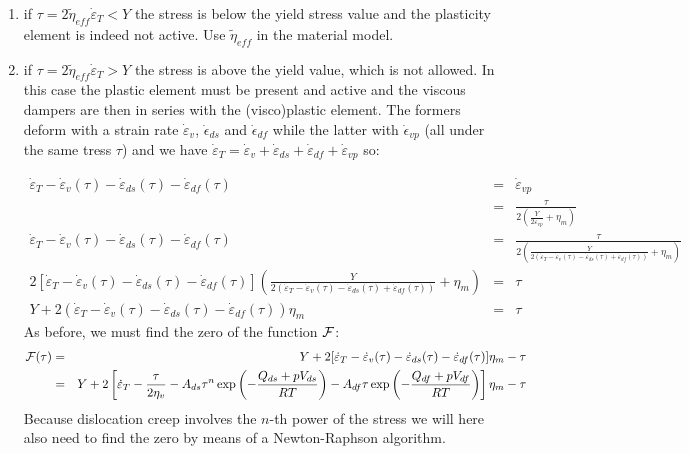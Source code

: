 \begin{itemize}
\begin{enumerate}
\item if $\tau =2 \tilde{\eta}_{eff} \dot\varepsilon_T < Y$ the stress is below the yield stress value 
and the plasticity element is indeed not active. Use $\tilde{\eta}_{eff}$ in the material model.

\item if $\tau=2 \tilde{\eta}_{eff} \dot\varepsilon_T > Y$ the stress is above the yield value, which is not 
allowed. In this case the plastic element must be present and active and the viscous dampers are then 
in series with the (visco)plastic element. The formers deform 
with a strain rate $\dot{\varepsilon}_v$, $\dot\epsilon_{ds}$ and $\dot{\epsilon}_{df}$ 
while the latter with $\dot\epsilon_{vp}$ (all under the same tress $\tau$) 
and we have  $\dot\varepsilon_T = \dot{\varepsilon}_v + \dot\varepsilon_{ds} + \dot\varepsilon_{df} + \dot\varepsilon_{vp}$ so:

\begin{eqnarray}
\dot\varepsilon_T - \dot{\varepsilon}_v(\tau) - \dot\varepsilon_{ds}(\tau) - \dot\varepsilon_{df}(\tau)  
&=& \dot\varepsilon_{vp}  \nonumber\\
&=& \frac{\tau}{2 \left( \frac{Y}{2\dot\varepsilon_{vp}} + \eta_m  \right)} 
\nonumber\\
\dot\varepsilon_T -  \dot{\varepsilon}_v(\tau) -\dot\varepsilon_{ds}(\tau) - \dot\varepsilon_{df}(\tau) 
&=&
\frac{\tau}{2 \left( \frac{Y}{2 (\dot\varepsilon_T -\dot{\varepsilon}_v(\tau) -\dot\varepsilon_{ds}(\tau) 
+ \dot\varepsilon_{df}(\tau)   )} + \eta_m  \right)} \nonumber
\\
2 [\dot\varepsilon_T -\dot{\varepsilon}_v(\tau) -\dot\varepsilon_{ds}(\tau) - \dot\varepsilon_{df}(\tau) ]
 \left( \frac{Y}{2 (\dot\varepsilon_T -\dot{\varepsilon}_v(\tau) -\dot\varepsilon_{ds}(\tau) + \dot\varepsilon_{df}(\tau)   )} + \eta_m  \right) &=& \tau 
\nonumber\\
Y + 2 (\dot\varepsilon_T - \dot{\varepsilon}_v(\tau) -\dot\varepsilon_{ds}(\tau) - \dot\varepsilon_{df}(\tau) ) \eta_m  &=& \tau \nonumber 
\end{eqnarray}
As before, we must find the zero of the function ${\cal F}$: 
\begin{eqnarray}
{\cal F}(\tau) 
&=& Y + 2 [\dot\varepsilon_T -\dot{\varepsilon}_v(\tau)- \dot\varepsilon_{ds}(\tau) -\dot\varepsilon_{df}(\tau) ]\eta_m -\tau \nonumber\\
&=& Y + 2 \left[ 
\dot\varepsilon_T - \frac{\tau}{2\eta_v}-A_{ds} \tau^n \exp \left(-\frac{Q_{ds}+pV_{ds}}{RT}\right) 
- A_{df} \tau   \exp \left(-\frac{Q_{df}+pV_{df}}{RT}\right)  
\right]\eta_m -\tau \nonumber
\end{eqnarray}
Because dislocation creep involves the $n$-th power of the stress we will here also need 
to find the zero by means of a Newton-Raphson algorithm. 


\end{enumerate}
\end{itemize}
